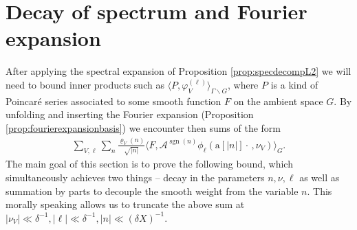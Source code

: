 \documentclass[12pt]{amsart}
\theoremstyle{definition}
\theoremstyle{remark}
\numberwithin{equation}{section}
\newcommand{\1}{{\mathbf 1}}
\newcommand{\sgn}{\operatorname{sgn}}
\begin{document}
\section{Decay of spectrum and Fourier expansion}\label{sec:decayandfourier}
After applying the spectral expansion of Proposition \ref{prop:specdecompL2} we will need to bound inner products such as  $\langle P, \varphi_{V}^{(\ell)}\rangle_{\Gamma\backslash G}$, where $P$ is a kind of Poincar\'e series associated to some smooth function $F$ on the ambient space $G$. By unfolding  and inserting the Fourier expansion  (Proposition \ref{prop:fourierexpansionbasis}) we encounter then sums of the form
\begin{align*}
  \sum_{V,\ell}\sum_{n} \frac{\varrho_V(n)}{\sqrt{|n|}}  \langle F, \mathcal{A}^{\sgn(n)} \phi_\ell(\mathrm{a}[|n|] \cdot \,,\nu_V) \rangle_{G}.
\end{align*}
The main goal of this section is to prove the following bound, which simultaneously achieves two things -- decay in the parameters $n, \nu,\ell$ as well as summation by parts to decouple the smooth weight from the variable $n$. This morally speaking allows us to truncate the above sum at $|\nu_V| \ll \delta^{-1},|\ell| \ll \delta^{-1}, |n| \ll (\delta X)^{-1}$.
\end{document}
